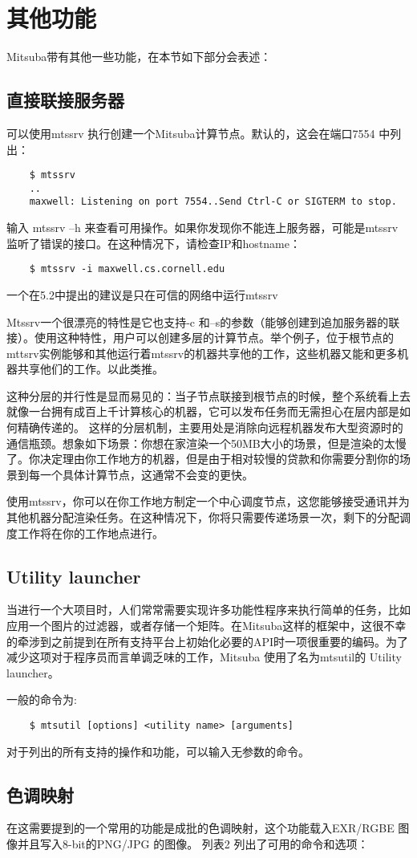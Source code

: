 \section{其他功能}
Mitsuba带有其他一些功能，在本节如下部分会表述：

\subsection{直接联接服务器}
可以使用mtssrv 执行创建一个Mitsuba计算节点。默认的，这会在端口7554 中列出：
\begin{lstlisting}
	$ mtssrv
	..
	maxwell: Listening on port 7554..Send Ctrl-C or SIGTERM to stop.
\end{lstlisting}
\par 
输入 mtssrv –h 来查看可用操作。如果你发现你不能连上服务器，可能是mtssrv 监听了错误的接口。在这种情况下，请检查IP和hostname：
\begin{lstlisting}
	$ mtssrv -i maxwell.cs.cornell.edu
\end{lstlisting}
一个在5.2中提出的建议是只在可信的网络中运行mtssrv
\par 
Mtssrv一个很漂亮的特性是它也支持-c 和–s的参数（能够创建到追加服务器的联接）。使用这种特性，用户可以创建多层的计算节点。举个例子，位于根节点的mttsrv实例能够和其他运行着mtssrv的机器共享他的工作，这些机器又能和更多机器共享他们的工作。以此类推。
\par 
这种分层的并行性是显而易见的：当子节点联接到根节点的时候，整个系统看上去就像一台拥有成百上千计算核心的机器，它可以发布任务而无需担心在层内部是如何精确传递的。
这样的分层机制，主要用处是消除向远程机器发布大型资源时的通信瓶颈。想象如下场景：你想在家渲染一个50MB大小的场景，但是渲染的太慢了。你决定理由你工作地方的机器，但是由于相对较慢的贷款和你需要分割你的场景到每一个具体计算节点，这通常不会变的更快。
\par 
使用mtssrv，你可以在你工作地方制定一个中心调度节点，这您能够接受通讯并为其他机器分配渲染任务。在这种情况下，你将只需要传递场景一次，剩下的分配调度工作将在你的工作地点进行。

\subsection{Utility launcher}
当进行一个大项目时，人们常常需要实现许多功能性程序来执行简单的任务，比如应用一个图片的过滤器，或者存储一个矩阵。在Mitsuba这样的框架中，这很不幸的牵涉到之前提到在所有支持平台上初始化必要的API时一项很重要的编码。为了减少这项对于程序员而言单调乏味的工作，Mitsuba 使用了名为mtsutil的 Utility launcher。
\par 
一般的命令为:
\begin{lstlisting}
	$ mtsutil [options] <utility name> [arguments]
\end{lstlisting}
\par
对于列出的所有支持的操作和功能，可以输入无参数的命令。

\subsection{色调映射}
在这需要提到的一个常用的功能是成批的色调映射，这个功能载入EXR/RGBE 图像并且写入8-bit的PNG/JPG 的图像。
列表2 列出了可用的命令和选项：






